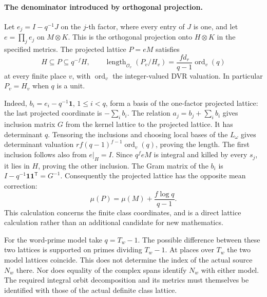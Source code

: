 \paragraph{The denominator introduced by orthogonal projection.}
%
Let \(e_j=I-q^{-1}J\) on the \(j\)-th factor, where every entry
of \(J\) is one, and let \(e=\prod_j e_j\) on \(M\otimes K\).
This is the orthogonal projection onto \(H\otimes K\) in the
specified metrics. The projected lattice \(P=eM\) satisfies
\begin{equation}
\label{eq:ramified-projector-index}
 H\subseteq P\subseteq q^{-f}H,\qquad
 \operatorname{length}_{\mathcal O_v}(P_v/H_v)
     =\frac{f d_r}{q-1}\operatorname{ord}_v(q)
\end{equation}
at every finite place \(v\), with \(\operatorname{ord}_v\) the
integer-valued DVR valuation. In particular \(P_v=H_v\) when
\(q\) is a unit.

Indeed, \(b_i=e_i-q^{-1}\mathbf1\), \(1\le i<q\), form a basis
of the one-factor projected lattice: the last projected coordinate
is \(-\sum_i b_i\). The relation
\(a_j=b_j+\sum_i b_i\) gives inclusion matrix \(G\) from the
kernel lattice to the projected lattice. It has determinant \(q\).
Tensoring the inclusions and choosing local bases of the
\(L_\omega\) gives determinant valuation
\(r f(q-1)^{f-1}\operatorname{ord}_v(q)\), proving the length.
The first inclusion follows also from \(e|_H=I\). Since
\(q^f eM\) is integral and killed by every \(s_j\), it lies in
\(H\), proving the other inclusion. The Gram matrix of the
\(b_i\) is \(I-q^{-1}\mathbf1\mathbf1^{\mathsf T}=G^{-1}\).
Consequently the projected lattice has the opposite mean correction:
\[
 \mu(P)=\mu(M)+\frac{f\log q}{q-1}.
\]
This calculation concerns the finite class coordinates, and is a
direct lattice calculation rather than an additional candidate
for new mathematics.

For the word-prime model take \(q=T_w-1\). The possible difference
between these two lattices is supported on primes dividing
\(T_w-1\). At places over \(T_w\) the two model lattices coincide.
This does not determine the index of the actual source \(N_w\)
there. Nor does equality of the complex spans identify \(N_w\)
with either model. The required integral orbit decomposition and
its metrics must themselves be identified with those of the
actual definite class lattice.

